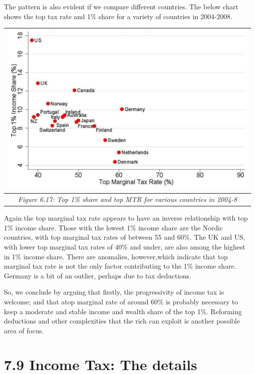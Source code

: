 \documentclass[]{tufte-handout}
\begin{document}
The pattern is also evident if we compare different countries. The below
chart shows the top tax rate and 1\% share for a variety of countries in
2004-2008.

\begin{longtable}[]{@{}c@{}}
\toprule
\includegraphics{ChapterPictures/6-16-TopShareTopMTR.jpg}\tabularnewline
\midrule
\endhead
\emph{Figure 6.17: Top 1\% share and top MTR for various countries in
2004-8}\tabularnewline
\bottomrule
\end{longtable}

Again the top marginal tax rate appears to have an inverse relationship
with top 1\% income share. Those with the lowest 1\% income share are
the Nordic countries, with top marginal tax rates of between 55 and
60\%. The UK and US, with lower top marginal tax rates of 40\% and
under, are also among the highest in 1\% income share. There are
anomalies, however,which indicate that top marginal tax rate is not the
only factor contributing to the 1\% income share. Germany is a bit of an
outlier, perhaps due to tax deductions.

So, we conclude by arguing that firstly, the progressivity of income tax
is welcome; and that atop marginal rate of around 60\% is probably
necessary to keep a moderate and stable income and wealth share of the
top 1\%. Reforming deductions and other complexities that the rich can
exploit is another possible area of focus.

\hypertarget{income-tax-the-details}{%
\section{7.9 Income Tax: The details}\label{income-tax-the-details}}
\end{document}

